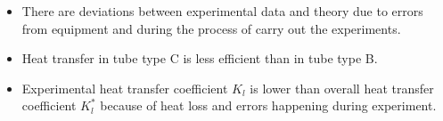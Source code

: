 \begin{itemize}
    \item There are deviations between experimental data and theory due to errors from equipment and during the process of carry out the experiments.
    \item Heat transfer in tube type C is less efficient than in tube type B.
    \item Experimental heat transfer coefficient $K_l$ is lower than overall heat transfer coefficient $K_l^*$ because of heat loss and errors happening during experiment.
\end{itemize}
